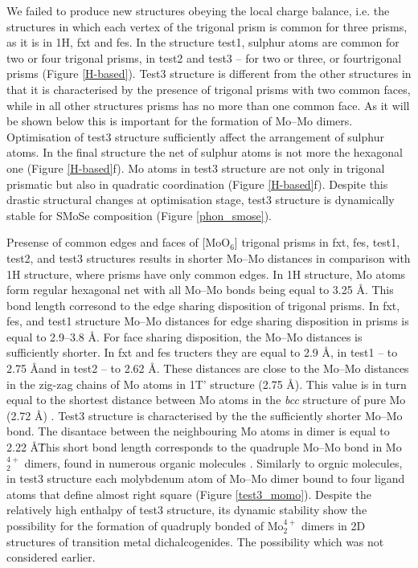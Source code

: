 \documentclass[a4paperm]{article}
\begin{document}
We failed to produce new structures obeying the local charge balance, i.e. the structures in which each vertex of the trigonal prism is common for three prisms, as it is in 1H, fxt and fes.
In the structure test1, sulphur atoms are common for two or four trigonal prisms, in test2 and test3 – for two or three, or fourtrigonal prisms (Figure \ref{H-based}).
Test3 structure is different from the other structures in that it is characterised by the presence of trigonal prisms with two common faces, while in all other structures prisms has no more than one common face.
As it will be shown below this is important for the formation of Mo--Mo dimers.
Optimisation of test3 structure sufficiently affect the arrangement of sulphur atoms.
In the final structure the net of sulphur atoms is not more the hexagonal one (Figure \ref{H-based}f).
Mo atoms in test3 structure are not only in trigonal prismatic but also in quadratic coordination (Figure \ref{H-based}f).
Despite this drastic structural changes at optimisation stage, test3 structure is dynamically stable for SMoSe composition (Figure \ref{phon_smose}).

Presense of common edges and faces of [MoO$_6$] trigonal prisms in fxt, fes, test1, test2, and test3 structures results in shorter Mo--Mo distances in comparison with 1H structure, where prisms have only common edges.
In 1H structure, Mo atoms form regular hexagonal net with all Mo--Mo bonds being equal to 3.25 \AA.
This bond length corresond to the edge sharing disposition of trigonal prisms.
In fxt, fes, and test1 structure Mo--Mo distances for edge sharing disposition in prisms is equal to 2.9--3.8 \AA.
For face sharing disposition, the Mo--Mo distances is sufficiently shorter.
In fxt and fes tructers they are equal to 2.9 \AA, in test1 -- to 2.75 \AA and in test2 -- to 2.62 \AA.
These distances are close to the Mo--Mo distances in the zig-zag chains of Mo atoms in 1T' structure (2.75 \AA).
This value is in turn equal to the shortest distance between Mo atoms in the {\it bcc} structure of pure Mo (2.72 \AA) \cite{MoV}.
Test3 structure is characterised by the the sufficiently shorter Mo--Mo bond.
The disantace between the neighbouring Mo atoms in dimer is equal to 2.22 \AA\.
This short bond length corresponds to the quadruple Mo--Mo bond in Mo$_2^{4+}$ dimers, found in numerous organic molecules \cite{momo}.
Similarly to orgnic molecules, in test3 structure  each molybdenum atom of Mo--Mo dimer bound to four ligand atoms that define almost right square (Figure \ref{test3_momo}).
Despite the relatively high enthalpy of test3 structure, its dynamic stability show the possibility for the formation of quadruply bonded of Mo$_2^{4+}$ dimers in 2D structures of transition metal dichalcogenides.
The possibility which was not considered earlier.
\end{document}
